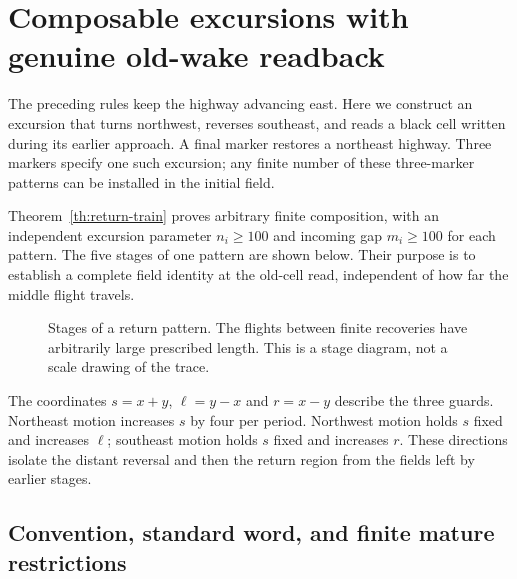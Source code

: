 \section{Composable excursions with genuine old-wake
readback}\label{composable-excursions-with-genuine-old-wake-readback}

The preceding rules keep the highway advancing east. Here we construct an
excursion that turns northwest, reverses southeast, and reads a black cell
written during its earlier approach. A final marker restores a northeast
highway. Three markers specify one such excursion; any finite number of these
three-marker patterns can be installed in the initial field.

Theorem~\ref{th:return-train} proves arbitrary finite composition, with an
independent excursion parameter $n_i\ge100$ and incoming gap $m_i\ge100$
for each pattern. The five stages of one pattern are shown below. Their
purpose is to establish a complete field identity at the old-cell read,
independent of how far the middle flight travels.

\begin{figure}[ht]
\centering
{}
\caption{Stages of a return pattern. The flights between finite recoveries
have arbitrarily large prescribed length. This is a stage diagram, not a
scale drawing of the trace.}
\end{figure}

The coordinates $s=x+y$, $\ell=y-x$ and $r=x-y$ describe the three guards.
Northeast motion increases $s$ by four per period. Northwest motion holds
$s$ fixed and increases $\ell$; southeast motion holds $s$ fixed and
increases $r$. These directions isolate the distant reversal and then the
return region from the fields left by earlier stages.

\subsection{Convention, standard word, and finite mature
restrictions}\label{returns-2}

